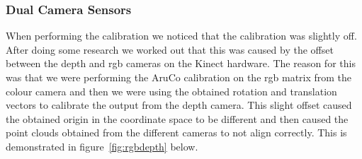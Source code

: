\documentclass{article}
\begin{document}
\subsubsection{Dual Camera Sensors}
When performing the calibration we noticed that the calibration was slightly off. After doing some research we worked out that this was caused by the offset between the depth and rgb cameras on the Kinect hardware. The reason for this was that we were performing the AruCo calibration on the rgb matrix from the colour camera and then we were using the obtained rotation and translation vectors to calibrate the output from the depth camera. This slight offset caused the obtained origin in the coordinate space to be different and then caused the point clouds obtained from the different cameras to not align correctly. This is demonstrated in figure~\ref{fig:rgbdepth} below.
\end{document}
